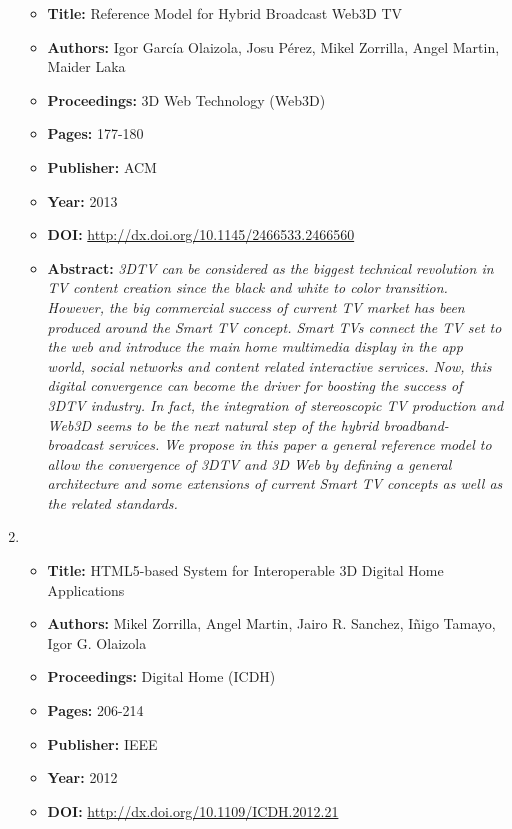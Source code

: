 \begin{enumerate}
\begin{itemize}
	\item \textbf{Title:} Reference Model for Hybrid Broadcast Web3D TV
	\item \textbf{Authors:} Igor García Olaizola, Josu Pérez, Mikel Zorrilla, Angel Martin, Maider Laka
	\item \textbf{Proceedings:} 3D Web Technology (Web3D)
	\item \textbf{Pages:} 177-180
 	\item \textbf{Publisher:} ACM
	\item \textbf{Year:} 2013
	\item \textbf{DOI:} \url{http://dx.doi.org/10.1145/2466533.2466560}
	\item \textbf{Abstract:} \textit{3DTV can be considered as the biggest technical revolution in TV content creation since the black and white to color transition. However, the big commercial success of current TV market has been produced around the Smart TV concept. Smart TVs connect the TV set to the web and introduce the main home multimedia display in the app world, social networks and content related interactive services. Now, this digital convergence can become the driver for boosting the success of 3DTV industry. In fact, the integration of stereoscopic TV production and Web3D seems to be the next natural step of the hybrid broadband-broadcast services. We propose in this paper a general reference model to allow the convergence of 3DTV and 3D Web by defining a general architecture and some extensions of current Smart TV concepts as well as the related standards.}
\end{itemize}
\hrulefill
\item 
\begin{itemize} \itemsep1pt\parskip0pt
	\item \textbf{Title:} HTML5-based System for Interoperable 3D Digital Home Applications
	\item \textbf{Authors:} Mikel Zorrilla, Angel Martin, Jairo R. Sanchez, Iñigo Tamayo, Igor G. Olaizola
	\item \textbf{Proceedings:} Digital Home (ICDH)
	\item \textbf{Pages:} 206-214
 	\item \textbf{Publisher:} IEEE
	\item \textbf{Year:} 2012
	\item \textbf{DOI:} \url{http://dx.doi.org/10.1109/ICDH.2012.21}

\end{itemize}
\end{enumerate}
